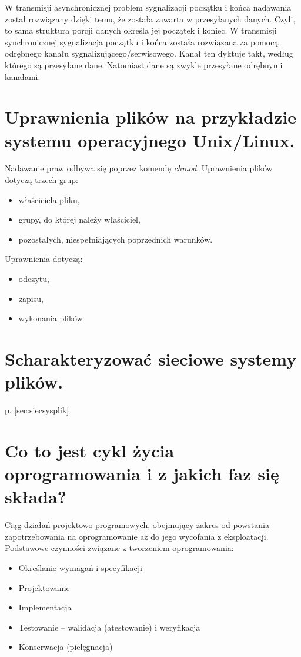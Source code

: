 \documentclass[12pt,a4paper]{article}
\begin{document}
	W transmisji asynchronicznej problem sygnalizacji początku i końca nadawania został rozwiązany dzięki temu, że została zawarta w przesyłanych danych. Czyli, to sama struktura porcji danych określa jej początek i koniec.
	W transmisji synchronicznej sygnalizacja początku i końca została rozwiązana za pomocą odrębnego kanału sygnalizującego/serwisowego. Kanał ten dyktuje takt, według którego są przesyłane dane. Natomiast dane są zwykle przesyłane odrębnymi kanałami.

	\section{Uprawnienia plików na przykładzie systemu operacyjnego Unix/Linux.}
	Nadawanie praw odbywa się poprzez komendę \textit{chmod}. Uprawnienia plików dotyczą trzech grup:
	\begin{itemize}
		\item właściciela pliku,
		\item grupy, do której należy właściciel,
		\item pozostałych, niespełniających poprzednich warunków.
	\end{itemize}
	
	Uprawnienia dotyczą:
	\begin{itemize}
		\item odczytu,
		\item zapisu,
		\item wykonania plików
	\end{itemize}

	\section{Scharakteryzować sieciowe systemy plików.}
	p. \ref{sec:siecsysplik}

	\section{Co to jest cykl życia oprogramowania i z jakich faz się składa?}
	Ciąg działań projektowo-programowych, obejmujący zakres od powstania zapotrzebowania na oprogramowanie aż do jego wycofania z eksploatacji. Podstawowe czynności związane z tworzeniem oprogramowania:
	\begin{itemize}
		\item Określanie wymagań i specyfikacji
		\item Projektowanie
		\item Implementacja
		\item Testowanie – walidacja (atestowanie) i weryfikacja
		\item Konserwacja (pielęgnacja)
	\end{itemize}
\end{document}
